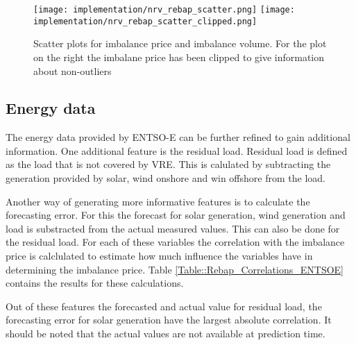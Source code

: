 \documentclass[class=scrbook, crop=false]{standalone}
\begin{document}
\begin{figure}[ht]
            \centering
            \texttt{[image: implementation/nrv\_rebap\_scatter.png]}
            \texttt{[image: implementation/nrv\_rebap\_scatter\_clipped.png]}
            \caption[Scatter plots for imbalance price and imbalance volume. For the plot on the right the imbalane price has been clipped to give information about non-outliers]{Scatter plots for imbalance price and imbalance volume. For the plot on the right the imbalane price has been clipped to give information about non-outliers}
            \label{fig::rebap_distribution}
\end{figure}

    \subsection{Energy data}
    \label{Section::Energy_Data}
    The energy data provided by ENTSO-E can be further refined to gain additional information.
    One additional feature is the residual load. 
    Residual load is defined as the load that is not covered by VRE. 
    This is calulated by subtracting the generation provided by solar, wind onshore and win offshore from the load.
    
    Another way of generating more informative features is to calculate the forecasting error. 
    For this the forecast for solar generation, wind generation and load is substracted from the actual measured values.
    This can also be done for the residual load.
    For each of these variables the correlation with the imbalance price is calclulated to estimate how much influence the variables have in determining the imbalance price.
    Table \ref{Table::Rebap_Correlations_ENTSOE} contains the results for these calculations. 
    
    Out of these features the forecasted and actual value for residual load, the forecasting error for solar generation have the largest absolute correlation.
    It should be noted that the actual values are not available at prediction time.    
\end{document}
